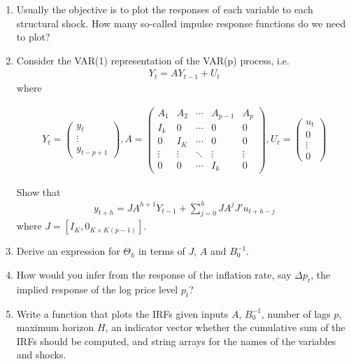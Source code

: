 \begin{enumerate}
\item Usually the objective is to plot the responses of each variable to each structural shock.
How many so-called impulse response functions do we need to plot?

\item Consider the VAR{(1)} representation of the VAR{(p)} process, i.e.\
\begin{align*}
Y_t = A Y_{t-1} + U_t
\end{align*}
where
\begin{footnotesize}
\begin{align*}
Y_t = \begin{pmatrix}
    y_t\\ \vdots\\ y_{t-p+1}
    \end{pmatrix}, 
    A = \begin{pmatrix}
    A_1 & A_2 & \cdots  & A_{p-1} & A_p\\
    I_k &   0 & \cdots  & 0       & 0\\
    0   &  I_K& \cdots  & 0       & 0\\
    \vdots & \vdots & \ddots &\vdots & \vdots\\ 
    0& 0 & \cdots  &I_k & 0
    \end{pmatrix},
    U_t = \begin{pmatrix} u_t\\0\\ \vdots \\0 \end{pmatrix}
\end{align*}
\end{footnotesize}
Show that
\begin{align*}
    y_{t+h} = J A^{h+1} Y_{t-1}+ \sum_{j=0}^h J A^j J' u_{t+h-j}
\end{align*}
where \(J=[I_K, 0_{K\times K(p-1)}]\).

\item Derive an expression for \(\Theta_h\) in terms of \(J\), \(A\) and \(B_0^{-1}\).

\item How would you infer from the response of the inflation rate, say \(\Delta p_t\), the implied response of the log price level \(p_t\)?
 	
\item Write a function that plots the IRFs given inputs \(A\), \(B_0^{-1}\), number of lags \(p\), maximum horizon \(H\),
  an indicator vector whether the cumulative sum of the IRFs should be computed, and string arrays for the names of the variables and shocks.
\end{enumerate}

